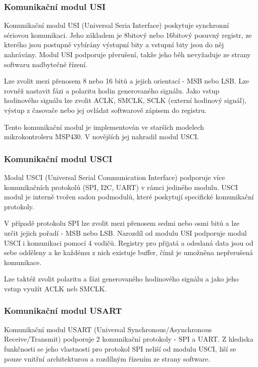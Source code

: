 \subsubsection{Komunikační modul USI}

Komunikační modul USI (Universal Seria Interface) poskytuje synchronní sériovou komunikaci. Jeho základem je 8bitový nebo 16bitový posuvný registr, ze kterého jsou postupně vybírány výstupní bity a vstupní bity jsou do něj nahrávány. Modul USI podporuje přerušení, takže jeho běh nevyžaduje ze strany softwaru nadbytečné řízení.

Lze zvolit mezi přenosem 8 nebo 16 bitů a jejich orientací - MSB nebo LSB. Lze rovněž nastavit fázi a polaritu hodin generovaného signálu. Jako vstup hodinového signálu lze zvolit ACLK, SMCLK, SCLK (externí hodinový signál), výstup z časovače nebo jej ovládat softwarově zápisem do registru.

Tento komunikační modul je implementován ve starších modelech mikrokontroleru MSP430. V novějších jej nahradil modul USCI.

\subsubsection{Komunikační modul USCI}

Modul USCI (Universal Serial Communication Interface) podporuje více komunikačních protokolů (SPI, I2C, UART) v rámci jediného modulu. USCI modul je interně tvořen sadou podmodulů, které poskytují specifické komunikační protokoly.

V případě protokolu SPI lze zvolit mezi přenosem sedmi nebo osmi bitů a lze určit jejich pořadí - MSB nebo LSB. Narozdíl od modulu USI podporuje modul USCI i komunikaci pomocí 4 vodičů. Registry pro přijatá a odeslaná data jsou od sebe odděleny a ke každému z nich existuje buffer, čímž je umožněna nepřerušená komunikace.

Lze taktéž zvolit polaritu a fázi generovaného hodinového signálu a jako jeho vstup využít ACLK neb SMCLK.

\subsubsection{Komunikační modul USART}

Komunikační modul USART (Universal Synchronous/Asynchronous Receive/Transmit) podporuje 2 komunikační protokoly - SPI a UART. Z hlediska funkčnosti se jeho vlastnosti pro protokol SPI neliší od modulu USCI, liší se pouze vnitřní architekturou a rozdílným řízením ze strany software.


